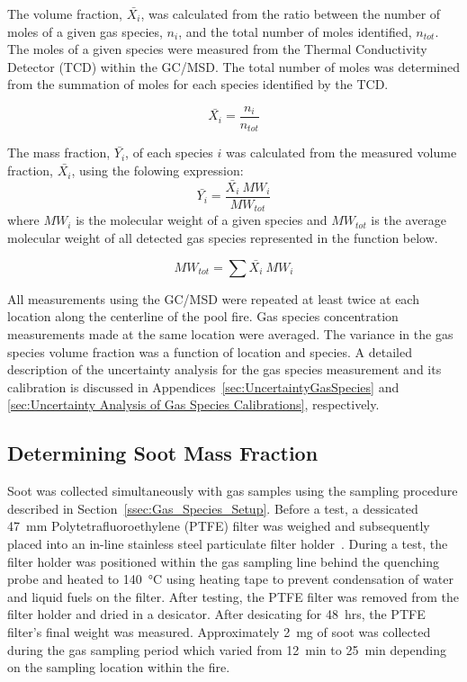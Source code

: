 \documentclass[12pt]{article}
\begin{document}
The volume fraction, $\bar{X_{i}}$, was calculated from the ratio between the number of moles of a given gas species, $n_{i}$, and the total number of moles identified, $n_{tot}$. The moles of a given species were measured from the Thermal Conductivity Detector (TCD) within the GC/MSD. The total number of moles was determined from the summation of moles for each species identified by the TCD.

\begin{equation}\label{eq:volume_fraction}
  \bar{X_{i}}= \frac{n_{i}}{n_{tot}}
\end{equation}

The mass fraction, $\bar{Y_{i}}$, of each species $i$ was calculated from the measured volume fraction, $\bar{X_{i}}$, using the folowing expression:
\begin{equation}\label{eq:mass_fraction}
\bar{Y_{i}}=\frac{\bar{X_{i}}~{MW_{i}}}{{MW_{tot}}}
\end{equation}
where ${{MW_{i}}}$ is the molecular weight of a given species and ${{MW_{tot}}}$ is the average molecular weight of all detected gas species represented in the function below. 

 \begin{equation}\label{eq:Total_MW}
{MW_{tot}}=\sum{\bar{X_{i}}~{MW_{i}}}
\end{equation}

All measurements using the GC/MSD were repeated at least twice at each location along the centerline of the pool fire. Gas species concentration measurements made at the same location were averaged. The variance in the gas species volume fraction was a function of location and species. A detailed description of the uncertainty analysis for the gas species measurement and its calibration is discussed in Appendices~\ref{sec:UncertaintyGasSpecies} and \ref{sec:Uncertainty Analysis of Gas Species Calibrations}, respectively.

\subsection{Determining Soot Mass Fraction}
\label{ssec:Soot_Setup}

Soot was collected simultaneously with gas samples using the sampling procedure described in Section~\ref{ssec:Gas_Species_Setup}. Before a test, a dessicated 47~\si{mm} Polytetrafluoroethylene (PTFE) filter was weighed and subsequently placed into an in-line stainless steel particulate filter holder~\cite{GelmanSciences1235}. During a test, the filter holder was positioned within the gas sampling line behind the quenching probe and heated to 140~°\si{C} using heating tape to prevent condensation of water and liquid fuels on the filter. After testing, the PTFE filter was removed from the filter holder and dried in a desicator. After desicating for 48~\si{hrs}, the PTFE filter's final weight was measured. Approximately 2~\si{mg} of soot was collected during the gas sampling period which varied from 12~\si{min} to 25~\si{min} depending on the sampling location within the fire.
\end{document}
